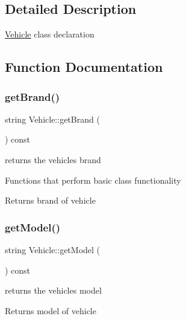\subsection{Detailed Description}
\hyperlink{class_vehicle}{Vehicle} class declaration 

\subsection{Function Documentation}
\mbox{\label{group___vehicle_ga6d5f105e83177b3738a639e4e613218f}} 
\subsubsection{\texorpdfstring{get\+Brand()}{getBrand()}}
{\footnotesize\ttfamily string Vehicle\+::get\+Brand (\begin{DoxyParamCaption}{ }\end{DoxyParamCaption}) const}



returns the vehicle\textquotesingle{}s brand 

Functions that perform basic class functionality \begin{DoxyReturn}{Returns}
brand of vehicle 
\end{DoxyReturn}
\mbox{\label{group___vehicle_ga42379788d946d27ab81851461cb56a49}} 
\subsubsection{\texorpdfstring{get\+Model()}{getModel()}}
{\footnotesize\ttfamily string Vehicle\+::get\+Model (\begin{DoxyParamCaption}{ }\end{DoxyParamCaption}) const}



returns the vehicle\textquotesingle{}s model 

\begin{DoxyReturn}{Returns}
model of vehicle 
\end{DoxyReturn}
\mbox{\label{group___vehicle_ga8ca5c5a020a718d9c320bd4b5c034cfe}} 
